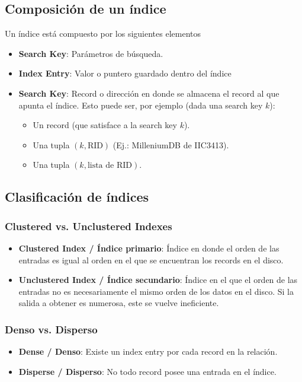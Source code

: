 \subsection{Composición de un índice}
Un índice está compuesto por los siguientes elementos
\begin{itemize}
  \item \textbf{Search Key}: Parámetros de búsqueda.
  \item \textbf{Index Entry}: Valor o puntero guardado dentro del índice
  \item \textbf{Search Key}: Record o dirección en donde se almacena el record al que apunta el índice. Esto puede ser, por ejemplo (dada una search key $k$):
  \begin{itemize}
    \item Un record (que satisface a la search key $k$).
    \item Una tupla $(k, \text{RID})$ (Ej.: MilleniumDB de IIC3413).
    \item Una tupla $(k, \text{lista de RID})$.
  \end{itemize}
\end{itemize}

\subsection{Clasificación de índices}
\subsubsection{Clustered vs. Unclustered Indexes}
\begin{itemize}
  \item \textbf{Clustered Index / Índice primario}: Índice en donde el orden de las entradas es igual al orden en el que se encuentran los records en el disco.
  \item \textbf{Unclustered Index / Índice secundario}: Índice en el que el orden de las entradas no es necesariamente el mismo orden de los datos en el disco. Si la salida a obtener es numerosa, este se vuelve ineficiente.
\end{itemize}

\subsubsection{Denso vs. Disperso}
\begin{itemize}
  \item \textbf{Dense / Denso}: Existe un index entry por cada record en la relación.
  \item \textbf{Disperse / Disperso}: No todo record posee una entrada en el índice.
\end{itemize}

